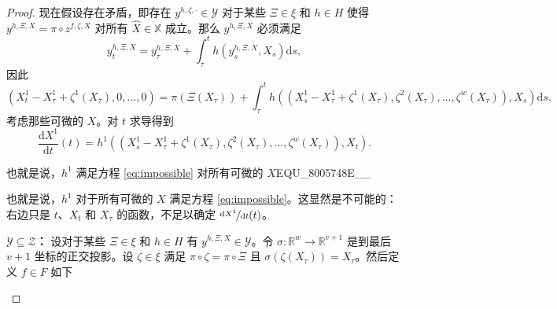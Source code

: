 \documentclass{ctexart}
\theoremstyle{plain}
\theoremstyle{definition}
\newcommand{\reals}{\mathbb{R}}
\newcommand{\ttfrac}[2]{\nicefrac{#1}{#2}}
\newcommand{\boldheading}[1]{

\textbf{#1}\quad}
\begin{document}
\begin{proof}
现在假设存在矛盾，即存在 $y^{h, \zeta, \cdot} \in \mathcal{Y}$ 对于某些 $\Xi \in \xi$ 和 $h \in H$ 使得 $y^{h, \Xi, X} = \pi \circ z^{f, \zeta, X}$ 对所有 $\widehat{X} \in \mathbb{X}$ 成立。那么 $y^{h, \Xi, X}$ 必须满足
\begin{equation*}
	y^{h, \Xi, X}_t = y^{h, \Xi, X}_\tau + \int_\tau^t h(y^{h, \Xi, X}_s, X_s) \mathrm{d}s,
\end{equation*}
因此
\begin{equation*}
	(X^1_t-X^1_{\tau} + \zeta^1(X_\tau), 0, \ldots, 0) = \pi(\Xi(X_\tau)) + \int_{\tau}^t h((X^1_s-X^1_{\tau} + \zeta^1(X_\tau), \zeta^2(X_\tau), \ldots, \zeta^w(X_\tau)), X_s) \mathrm{d}s.
\end{equation*}
考虑那些可微的 $X$。对 $t$ 求导得到
\begin{equation}\label{eq:impossible}
	\frac{\mathrm{d}X^1}{\mathrm{d}t}(t) = h^1((X^1_s-X^1_{\tau} + \zeta^1(X_\tau), \zeta^2(X_\tau), \ldots, \zeta^w(X_\tau)), X_t).
\end{equation}
	
也就是说，$h^1$ 满足方程 \eqref{eq:impossible} 对所有可微的 $X$EQU_8005748E__

	也就是说，$h^1$ 对于所有可微的 $X$ 满足方程 \eqref{eq:impossible}。这显然是不可能的：右边只是 $t$、$X_t$ 和 $X_{\tau}$ 的函数，不足以确定 $\ttfrac{\mathrm{d}X^1}{\mathrm{d}t}(t)$。

	\boldheading{$\mathcal{Y} \subseteq \mathcal{Z}$：}
	设对于某些 $\Xi \in \xi$ 和 $h \in H$ 有 $y^{h, \Xi, X} \in \mathcal{Y}$。令 $\sigma \colon \reals^w \to \reals^{v + 1}$ 是到最后 $v + 1$ 坐标的正交投影。设 $\zeta \in \xi$ 满足 $\pi \circ \zeta = \pi \circ \Xi$ 且 $\sigma(\zeta(X_\tau)) = X_\tau$。然后定义 $f \in F$ 如下
\begin{center}
\end{center}
\end{proof}
\end{document}

